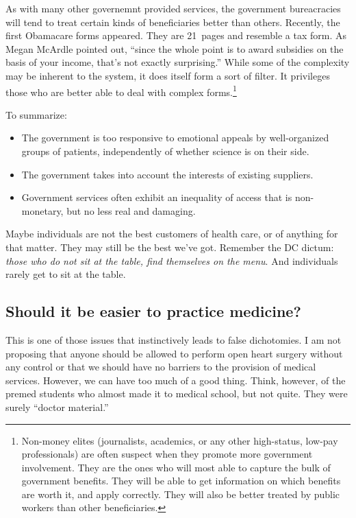 As with many other governemnt provided services, the government bureacracies
will tend to treat certain kinds of beneficiaries better than others.
Recently, the first Obamacare forms appeared. They are 21~pages and resemble a
tax form. As Megan McArdle pointed out, ``since the whole point is to award
subsidies on the basis of your income, that's not exactly
surprising.''
While some of the complexity may be inherent to the system, it does itself form
a sort of filter. It privileges those who are better able to deal with complex
forms.\footnote{Non-money elites (journalists, academics, or any other
high-status, low-pay professionals) are often suspect when they promote more
government involvement. They are the ones who will most able to capture the
bulk of government benefits. They will be able to get information on which
benefits are worth it, and apply correctly. They will also be better treated by
public workers than other beneficiaries.}

To summarize:
\begin{itemize}
\item The government is too responsive to emotional appeals by well-organized
groups of patients, independently of whether science is on their side.
\item The government takes into account the interests of existing suppliers.
\item Government services often exhibit an inequality of access that is
non-monetary, but no less real and damaging.
\end{itemize}

Maybe individuals are not the best customers of health care, or of anything for
that matter. They may still be the best we've got. Remember the DC dictum:
\emph{those who do not sit at the table, find themselves on the menu}. And
individuals rarely get to sit at the table.

\subsection{Should it be easier to practice medicine?}

This is one of those issues that instinctively leads to false dichotomies. I am
not proposing that anyone should be allowed to perform open heart surgery
without any control or that we should have no barriers to the provision of
medical services. However, we can have too much of a good thing. Think,
however, of the premed students who almost made it to medical school, but not
quite. They were surely ``doctor material.''

